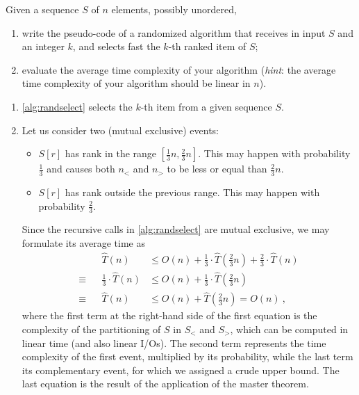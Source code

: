 \exercise

Given a sequence $S$ of $n$ elements, possibly unordered,
%
\begin{enumerate}

  \item write the pseudo-code of a randomized algorithm that receives in input
  $S$ and an integer $k$, and selects fast the $k$-th ranked item of $S$;

  \item evaluate the average time complexity of your algorithm (\emph{hint}: the
  average time complexity of your algorithm should be linear in $n$).

\end{enumerate}

\solution

\begin{enumerate}

  \item \autoref{alg:randselect} selects the $k$-th item from a given sequence
  $S$.

  \item Let us consider two (mutual exclusive) events:
  \begin{itemize}

    \item $S[r]$ has rank in the range $\left[\frac{1}{3}n,
    \frac{2}{3}n\right]$. This may happen with probability $\frac{1}{3}$ and
    causes both $n_<$ and $n_>$ to be less or equal than $\frac{2}{3}n$.

    \item $S[r]$ has rank outside the previous range. This may happen with
    probability $\frac{2}{3}$.

  \end{itemize}
  Since the recursive calls in \autoref{alg:randselect} are mutual exclusive, we
  may formulate its average time as
  \begin{align*}
    && && &&        && \widehat{T}(n) &\le O(n) + \frac{1}{3}\cdot\widehat{T}\left(\frac{2}{3}n\right) + \frac{2}{3}\cdot\widehat{T}\left(n\right) && && && \\
    && && && \equiv && \frac{1}{3}\cdot\widehat{T}\left(n\right) &\le O(n) + \frac{1}{3}\cdot\widehat{T}\left(\frac{2}{3}n\right) && && && \\
    && && && \equiv && \widehat{T}\left(n\right) &\le O(n) + \widehat{T}\left(\frac{2}{3}n\right) = O(n)\ ,&& && &&
  \end{align*}
  where the first term at the right-hand side of the first equation is the
  complexity of the partitioning of $S$ in $S_<$ and $S_>$, which can be
  computed in linear time (and also linear I/Os). The second term represents the
  time complexity of the first event, multiplied by its probability, while the
  last term its complementary event, for which we assigned a crude upper bound.
  The last equation is the result of the application of the master theorem.

\end{enumerate}
